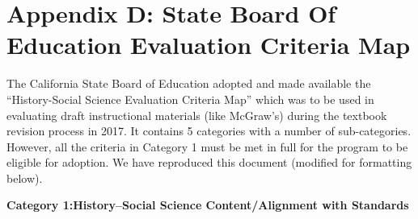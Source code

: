 \chapter{Appendix D: State Board Of Education Evaluation Criteria Map}

The California State Board of Education adopted and made available the “History-Social Science Evaluation Criteria Map” which was to be used in evaluating draft instructional materials (like McGraw’s) during the textbook revision process in 2017. It contains 5 categories with a number of sub-categories. However, all the criteria in Category 1 must be met in full for the program to be eligible for adoption. We have reproduced this document (modified for formatting below).

\textbf{Category 1:History–Social Science Content/Alignment with Standards} 


